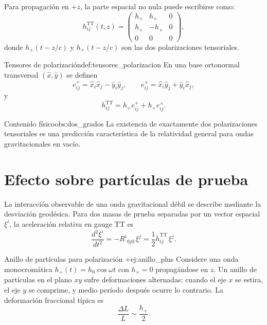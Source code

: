 Para propagación en $+z$, la parte espacial no nula puede escribirse como:
\begin{equation}
  h_{ij}^{\mathrm{TT}}(t,z)=
  \begin{pmatrix}
    h_+ & h_\times & 0\\
    h_\times & -h_+ & 0\\
    0 & 0 & 0
  \end{pmatrix},
\end{equation}
donde $h_+(t-z/c)$ y $h_\times(t-z/c)$ son las dos polarizaciones tensoriales.

\begin{definicion}{Tensores de polarización}{def:tensores_polarizacion}
En una base ortonormal transversal $(\hat{x},\hat{y})$ se definen
\begin{equation}
  e^{+}_{ij}=\hat{x}_i\hat{x}_j-\hat{y}_i\hat{y}_j,
  \qquad
  e^{\times}_{ij}=\hat{x}_i\hat{y}_j+\hat{y}_i\hat{x}_j,
\end{equation}
y
\begin{equation}
  h_{ij}^{\mathrm{TT}}=h_+ e^{+}_{ij}+h_\times e^{\times}_{ij}.
\end{equation}
\end{definicion}

\begin{observacion}{Contenido físico}{obs:dos_grados}
La existencia de exactamente dos polarizaciones tensoriales es una predicción característica de la relatividad general para ondas gravitacionales en vacío.
\end{observacion}

\section{Efecto sobre partículas de prueba}
\label{sec:efecto_particulas}

La interacción observable de una onda gravitacional débil se describe mediante la desviación geodésica. Para dos masas de prueba separadas por un vector espacial $\xi^i$, la aceleración relativa en gauge TT es
\begin{equation}
  \frac{d^2\xi^i}{dt^2}=-R^i{}_{0j0}\,\xi^j
  =\frac{1}{2}\ddot h^{\mathrm{TT}}_{ij}\,\xi^j.
  \label{eq:geodesic_deviation_tt}
\end{equation}

\begin{ejemplo}{Anillo de partículas para polarización $+$}{ej:anillo_plus}
Considere una onda monocromática $h_+(t)=h_0\cos\omega t$ con $h_\times=0$ propagándose en $z$. Un anillo de partículas en el plano $xy$ sufre deformaciones alternadas: cuando el eje $x$ se estira, el eje $y$ se comprime, y medio período después ocurre lo contrario. La deformación fraccional típica es
\begin{equation}
  \frac{\Delta L}{L}\sim\frac{h_+}{2}.
\end{equation}
\end{ejemplo}

